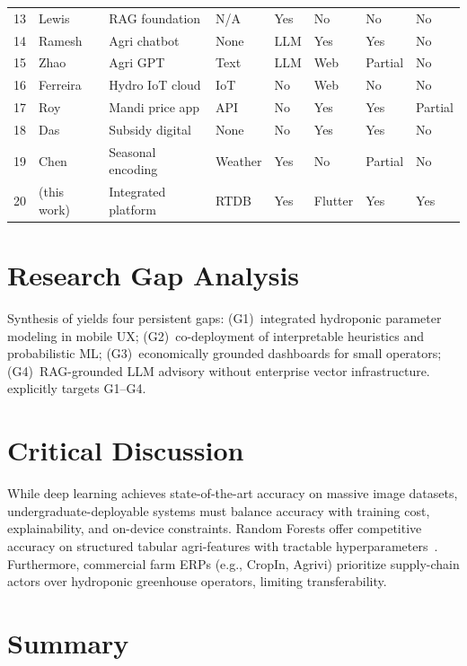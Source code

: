 \begin{longtable}{@{}p{0.5cm}p{2.1cm}p{2.4cm}p{1.5cm}p{1.2cm}p{1.2cm}p{1.2cm}p{1.5cm}@{}}
13 & Lewis~\cite{lewis2020rag} & RAG foundation & N/A & Yes & No & No & No \\
14 & Ramesh~\cite{ramesh2024agri_chatbot} & Agri chatbot & None & LLM & Yes & Yes & No \\
15 & Zhao~\cite{zhao2023agri_gpt} & Agri GPT & Text & LLM & Web & Partial & No \\
16 & Ferreira~\cite{ferreira2021hydro_iot} & Hydro IoT cloud & IoT & No & Web & No & No \\
17 & Roy~\cite{roy2022mandi_app} & Mandi price app & API & No & Yes & Yes & Partial \\
18 & Das~\cite{das2023subsidy_portal} & Subsidy digital & None & No & Yes & Yes & No \\
19 & Chen~\cite{chen2024seasonal_ml} & Seasonal encoding & Weather & Yes & No & Partial & No \\
20 & \HydroSmart{} (this work) & Integrated platform & RTDB & Yes & Flutter & Yes & Yes \\
\bottomrule
\end{longtable}

\section{Research Gap Analysis}
\label{sec:lit_gap}

Synthesis of  yields four persistent gaps: (G1)~integrated hydroponic parameter modeling in mobile UX; (G2)~co-deployment of interpretable heuristics and probabilistic ML; (G3)~economically grounded dashboards for small operators; (G4)~RAG-grounded LLM advisory without enterprise vector infrastructure. \HydroSmart{} explicitly targets G1--G4.

\section{Critical Discussion}
\label{sec:lit_critical}

While deep learning achieves state-of-the-art accuracy on massive image datasets, undergraduate-deployable systems must balance accuracy with training cost, explainability, and on-device constraints. Random Forests offer competitive accuracy on structured tabular agri-features with tractable hyperparameters~\cite{breiman2001rf,sharma2022crop_ml}. Furthermore, commercial farm ERPs (e.g., CropIn, Agrivi) prioritize supply-chain actors over hydroponic greenhouse operators, limiting transferability.

\section{Summary}
\label{sec:lit_summary}


